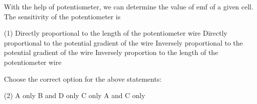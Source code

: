 \item With the help of potentiometer, we can determine the value of emf of a given cell. The sensitivity of the potentiometer is
    \begin{tasks}(1)
        \task Directly proportional to the length of the potentiometer wire
        \task Directly proportional to the potential gradient of the wire
        \task Inversely proportional to the potential gradient of the wire
        \task Inversely proportion to the length of the potentiometer wire
    \end{tasks}
    Choose the correct option for the above statements:
    \begin{tasks}(2)
        \task A only
        \task B and D only
        \task C only
        \task A and C only
    \end{tasks}